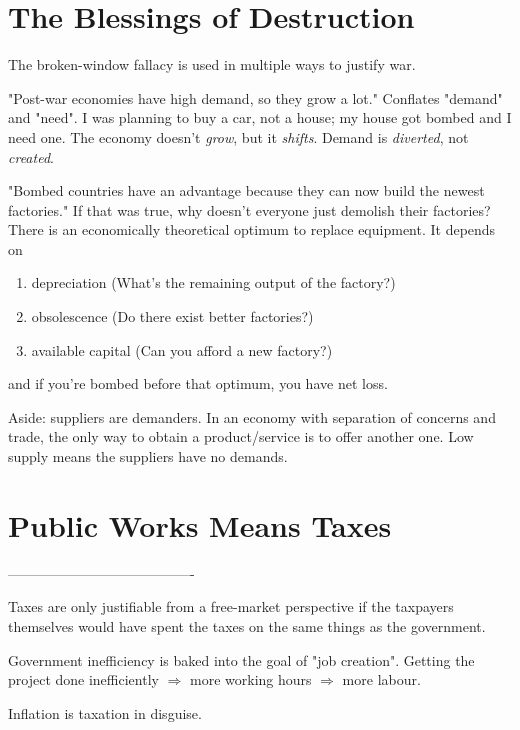 \section{The Blessings of Destruction}
\begin{outline}
\1 The broken-window fallacy is used in multiple ways to justify war.

\1 "Post-war economies have high demand, so they grow a lot."
	\2 Conflates "demand" and "need". I was planning to buy a car, not a house; my house got bombed and I need one.
	\2 The economy doesn't \emph{grow}, but it \emph{shifts}. Demand is \emph{diverted}, not \emph{created}.

\1 "Bombed countries have an advantage because they can now build the newest factories."
	\2 If that was true, why doesn't everyone just demolish their factories?
	\2 There is an economically theoretical optimum to replace equipment. It depends on 
	\begin{enumerate}
		\item depreciation (What's the remaining output of the factory?)
		\item obsolescence (Do there exist better factories?)
		\item available capital (Can you afford a new factory?)
	\end{enumerate}
	and if you're bombed before that optimum, you have net loss.

\1 Aside: suppliers are demanders.
	\2 In an economy with separation of concerns and trade, the only way to obtain a product/service is to offer another one. Low supply means the suppliers have no demands.
\end{outline}

\section{Public Works Means Taxes}
\begin{outline}
----------------------------------------

\1 Taxes are only justifiable from a free-market perspective if the taxpayers themselves would have spent the taxes on the same things as the government.
	
\1 Government inefficiency is baked into the goal of "job creation". 
	\2 Getting the project done inefficiently $\Rightarrow$ more working hours $\Rightarrow$ more labour.

\1 Inflation is taxation in disguise.
\end{outline}

